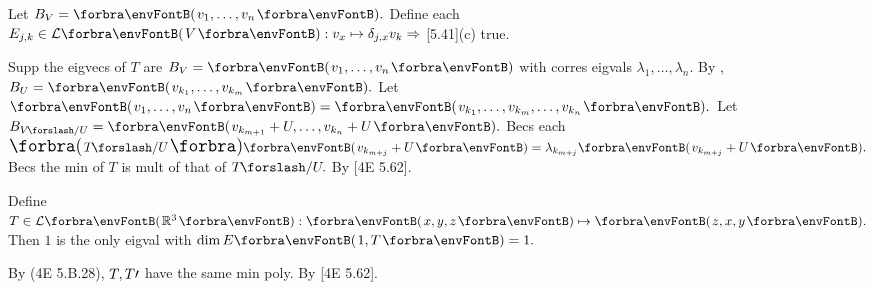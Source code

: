 Let $B_V=\Par{v_1,\dots,v_n}.$ Define each $E_{j,k}\in\Lm{V}:v_x\mapsto\delta_{j,x}v_k\Rightarrow$ [5.41](c) true.\PfEnd
\SepLine

Supp the eigvecs of $T$ are $B_V=\Par{v_1,\dots,v_n}$ with corres eigvals $\lambda_1,\dots,\lambda_n.$\parSol{}
By , $B_U=\Par{v_{k_1},\dots,v_{k_m}}.$ Let $\Par{v_1,\dots,v_n}=\Par{v_{k_1},\dots,v_{k_m},\dots,v_{k_n}}.$\parSol{}
Let $B_{V\XSlash U}=\Par{v_{k_{m+1}}+U,\dots,v_{k_n}+U}.$ Becs each $\BigPar{T\XSlash U}\Par{v_{k_{m+j}}+U}=\lambda_{k_{m+j}}\Par{v_{k_{m+j}}+U}.$\PfEnd\vspace{3pt}\parSol{}
\Or Becs the min of $T$ is mult of that of $T\XSlash U.$ By [4E 5.62].\PfEnd
\SepLine

Define $T\in\Lm{\Rbb^3}:\Par{x,y,z}\mapsto\Par{z,x,y}.$ Then $1$ is the only eigval with $\dim E\Par{1,T}=1.$\PfEnd
\SepLine

By (4E 5.B.28), $T,T\prime$ have the same min poly. By [4E 5.62].\PfEnd
\SepLine


